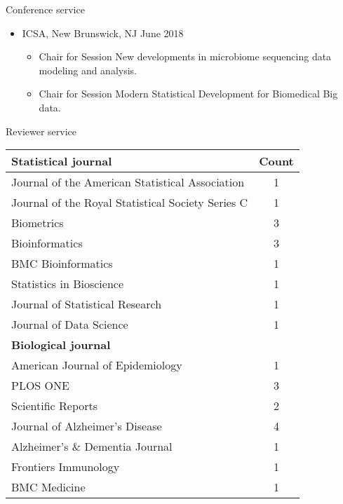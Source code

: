 \documentclass{resume} %
\begin{document}

\begin{rSection}{Conference service}

\begin{itemize}[noitemsep,topsep=0pt]

\item  ICSA, New Brunswick, NJ  \hfill {June 2018}
\begin{itemize}[noitemsep,topsep=0pt]
\item{Chair for Session New developments in microbiome sequencing data modeling and analysis.}
\item{Chair for Session Modern Statistical Development for Biomedical Big data.}
\end{itemize}


\end{itemize}

\end{rSection}


\begin{rSection}{Reviewer service}

\begin{table}[htp]
\begin{center}
\begin{tabular}{l c }
\hline
\hline
\bf{Statistical journal} & Count \\
\hline
Journal of the American Statistical Association & 1 \\
Journal of the Royal Statistical Society Series C & 1 \\
Biometrics & 3 \\
Bioinformatics & 3 \\
BMC Bioinformatics & 1 \\
Statistics in Bioscience & 1 \\
Journal of Statistical Research & 1 \\
Journal of Data Science & 1 \\
\hline
\hline
\bf{Biological journal} &  \\
\hline
American Journal of Epidemiology & 1 \\
PLOS ONE & 3 \\
Scientific Reports & 2 \\
Journal of Alzheimer's Disease & 4 \\
Alzheimer's \& Dementia Journal & 1 \\
Frontiers Immunology & 1 \\
BMC Medicine & 1 \\
\hline
\hline
\end{tabular}
\end{center}
\label{default}
\end{table}%


\end{rSection}
\end{document}
